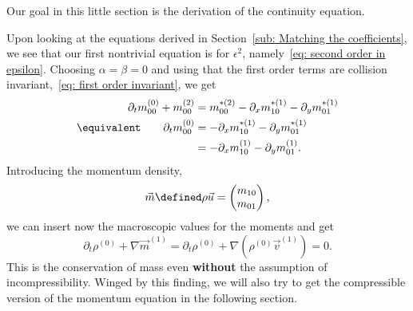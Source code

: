 Our goal in this little section is the derivation of the continuity equation.

Upon looking at the equations derived in Section~\ref{sub: Matching the coefficients}, we see that our first nontrivial equation is for $\epsilon^2$, namely~\eqref{eq: second order in epsilon}.
Choosing $\alpha=\beta=0$ and using that the first order terms are collision invariant,~\eqref{eq: first order invariant}, we get
\begin{equation}
    \begin{aligned}
      \partial_t m_{00}^{(0)} + m_{00}^{(2)} & =  m_{00}^{*(2)} - \partial_x m_{10}^{*(1)} - \partial_y m_{01}^{*(1)} \\
      \equivalent \qquad \partial_t m_{00}^{(0)} & =  - \partial_x m_{10}^{*(1)} - \partial_y m_{01}^{*(1)} \\
      & =  - \partial_x m_{10}^{(1)} - \partial_y m_{01}^{(1)}.
    \end{aligned}
\end{equation}
Introducing the momentum density,
\begin{equation}
  \vec{m} \defined \rho \vec{u} = \begin{pmatrix}m_{10} \\m_{01}  \end{pmatrix},
\end{equation}
we can insert now the macroscopic values for the moments and get
\begin{equation}
  \partial_t \rho^{(0)} + \nabla \vec{m}^{(1)} =
  \partial_t \rho^{(0)} + \nabla (\rho^{(0)} \vec{v}^{(1)}) = 0.
\end{equation}
This is the conservation of mass even \textbf{without} the assumption of incompressibility.
Winged by this finding, we will also try to get the compressible version of the momentum equation in the following section.
